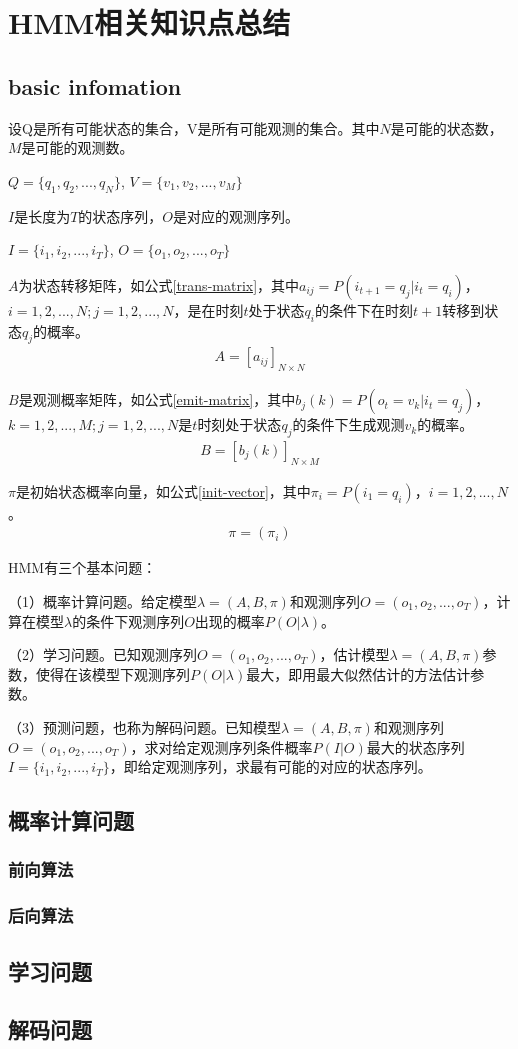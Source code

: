 \chapter{HMM相关知识点总结}
\section{basic infomation}
设Q是所有可能状态的集合，V是所有可能观测的集合。其中$N$是可能的状态数，$M$是可能的观测数。
\begin{center}
$Q=\{q_1, q_2, ..., q_N\}$, $V = \{v_1, v_2, ..., v_M\}$
\end{center}

$I$是长度为$T$的状态序列，$O$是对应的观测序列。
\begin{center}
$I=\{i_1, i_2, ..., i_T\}$, $O = \{o_1, o_2, ..., o_T\}$
\end{center}

$A$为状态转移矩阵，如公式\ref{trans-matrix}，其中$a_{ij}=P(i_{t+1}=q_j|i_t=q_i)$，$i=1,2,...,N; j=1,2,...,N$，是在时刻$t$处于状态$q_i$的条件下在时刻$t+1$转移到状态$q_j$的概率。
\begin{align}
\label{trans-matrix}
A=[a_{ij}]_{N\times{N}}
\end{align}

$B$是观测概率矩阵，如公式\ref{emit-matrix}，其中$b_j(k)=P(o_t=v_k|i_t=q_j)$，$k=1,2,...,M; j=1,2,...,N$是$t$时刻处于状态$q_j$的条件下生成观测$v_k$的概率。
\begin{align}
\label{emit-matrix}
B=[b_{j}(k)]_{N\times{M}}
\end{align}

$\pi$是初始状态概率向量，如公式\ref{init-vector}，其中$\pi_i=P(i_1=q_i)$，$i=1,2,...,N$。
\begin{align}
\label{init-vector}
\pi = (\pi_i)
\end{align}

HMM有三个基本问题：

（1）概率计算问题。给定模型$\lambda=(A,B,\pi)$和观测序列$O=(o_1, o_2, ..., o_T)$，计算在模型$\lambda$的条件下观测序列$O$出现的概率$P(O|\lambda)$。

（2）学习问题。已知观测序列$O=(o_1, o_2, ..., o_T)$，估计模型$\lambda=(A,B,\pi)$参数，使得在该模型下观测序列$P(O|\lambda)$最大，即用最大似然估计的方法估计参数。

（3）预测问题，也称为解码问题。已知模型$\lambda=(A,B,\pi)$和观测序列$O=(o_1, o_2, ..., o_T)$，求对给定观测序列条件概率$P(I|O)$最大的状态序列$I=\{i_1, i_2, ..., i_T\}$，即给定观测序列，求最有可能的对应的状态序列。

\section{概率计算问题}
\subsection{前向算法}

\subsection{后向算法}

\section{学习问题}

\section{解码问题}